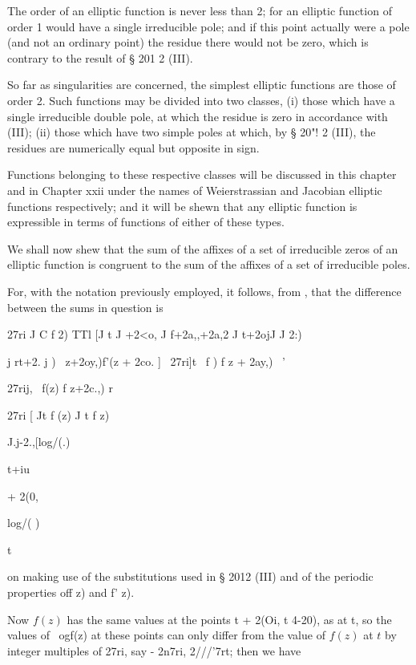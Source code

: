 The order of an elliptic function is never less than 2; for an
elliptic function of order 1 would have a single irreducible pole;
and if this point actually were a pole (and not an ordinary point) the
residue there would not be zero, which is contrary to the result of §
201 2 (III).

So far as singularities are concerned, the simplest elliptic functions
are those of order 2. Such functions may be divided into two classes,
(i) those which have a single irreducible double pole, at which the
residue is zero in accordance with  (III); (ii) those which
have two simple poles at which, by § 20"! 2 (III), the residues are
numerically equal but opposite in sign.

Functions belonging to these respective classes will be discussed in
this chapter and in Chapter xxii under the names of Weierstrassian and
Jacobian elliptic functions respectively; and it will be shewn that
any elliptic function is expressible in terms of functions of either
of these types.

%
%


We shall now shew that the sum of the affixes of a set of irreducible
zeros of an elliptic function is congruent to the sum of the affixes
of a set of irreducible poles.

For, with the notation previously employed, it follows, from ,
that the difference between the sums in question is

27ri J C f 2) TTl [J t J +2<o, J f+2a,,+2a,2 J t+2ojJ J 2:)

  j rt+2. j ) \ z+2oy,)f'(z + 2co. ] ~27ri]t \ f ) f z + 2ay,) \ '

27rij, \ f(z) f z+2c.,) r

27ri [ Jt f (z) J t f z)

J.j-2.,[log/(.)

t+iu

+ 2(0,

log/( )

t

on making use of the substitutions used in § 2012 (III) and of the
periodic properties off z) and f' z).

Now $f(z)$ has the same values at the points t + 2(Oi, t 4-20), as at t,
so the values of \ ogf(z) at these points can only differ from the
value of $f(z)$ at $t$ by integer multiples of 27ri, say - 2n7ri,
2///'7rt; then we have

